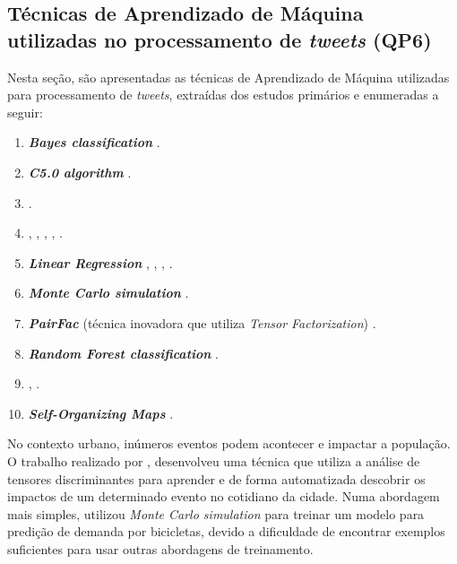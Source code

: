 \documentclass[
	12pt,				%
	oneside,			%
	a4paper,			%
	english,			%
	brazil				%
	]{abntex2ppgsi}
\begin{document}
{{\begin{enumerate}
\end{enumerate}

\subsection{Técnicas de Aprendizado de Máquina utilizadas no processamento de \textit{tweets} (QP6)}
\label{iaClassification}
Nesta seção, são apresentadas as técnicas de Aprendizado de Máquina utilizadas para processamento de \textit{tweets}, extraídas dos estudos primários e enumeradas a seguir:

\begin{enumerate}
\item \textit{\textbf{Bayes classification}} \cite{Mata2015}.
\item \textit{\textbf{C5.0 algorithm}} \cite{Zagal2016}.
\item {} \cite{Anantharam2015}.
\item {} \cite{Farseev2015}, \cite{Abbasi2015}, \cite{Hasan2014}, \cite{DiLorenzo2013}, \cite{Ni2016} .
\item \textit{\textbf{Linear Regression}} \cite{Gutev2016}, \cite{Bendler2014}, \cite{Ni2016}, \cite{Guo2016}.
\item \textit{\textbf{Monte Carlo simulation}} \cite{Chen2016}.
\item \textbf{\textit{PairFac}} (técnica inovadora que utiliza \textit{Tensor Factorization}) \cite{Wen2016}.
\item \textit{\textbf{Random Forest classification}} \cite{Farseev2015}.
\item {} \cite{Mukherjee2015}, \cite{Gal-Tzur2014}.
\item \textit{\textbf{Self-Organizing Maps}} \cite{Frias-Martinez2014}.
\end{enumerate}

No contexto urbano, inúmeros eventos podem acontecer e impactar a população. O trabalho realizado por \cite{Wen2016}, desenvolveu uma técnica que utiliza a análise de tensores discriminantes para aprender e de forma automatizada descobrir os impactos de um determinado evento no cotidiano da cidade. Numa abordagem mais simples, \cite{Chen2016} utilizou \textit{Monte Carlo simulation} para treinar um modelo para predição de demanda por bicicletas, devido a dificuldade de encontrar exemplos suficientes para usar outras abordagens de treinamento. 

}}
\end{document}
